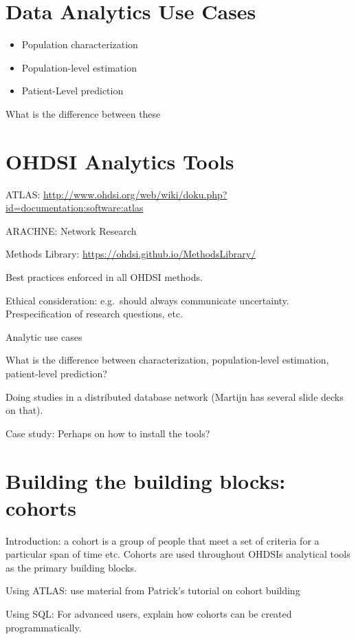 \documentclass[]{book}
\providecommand{\tightlist}{%
  \setlength{\itemsep}{0pt}\setlength{\parskip}{0pt}}
\begin{document}
\chapter{Data Analytics Use Cases}\label{DataAnalyticsUseCases}

\begin{itemize}
\tightlist
\item
  Population characterization
\item
  Population-level estimation
\item
  Patient-Level prediction
\end{itemize}

What is the difference between these

\chapter{OHDSI Analytics Tools}\label{OhdsiAnalyticsTools}

ATLAS:
\url{http://www.ohdsi.org/web/wiki/doku.php?id=documentation:software:atlas}

ARACHNE: Network Research

Methods Library: \url{https://ohdsi.github.io/MethodsLibrary/}

Best practices enforced in all OHDSI methods.

Ethical consideration: e.g.~should always communicate uncertainty.
Prespecification of research questions, etc.

Analytic use cases

What is the difference between characterization, population-level
estimation, patient-level prediction?

Doing studies in a distributed database network (Martijn has several
slide decks on that).

Case study: Perhaps on how to install the tools?

\chapter{Building the building blocks: cohorts}\label{Cohorts}

Introduction: a cohort is a group of people that meet a set of criteria
for a particular span of time etc. Cohorts are used throughout OHDSIs
analytical tools as the primary building blocks.

Using ATLAS: use material from Patrick's tutorial on cohort building

Using SQL: For advanced users, explain how cohorts can be created
programmatically.
\end{document}
